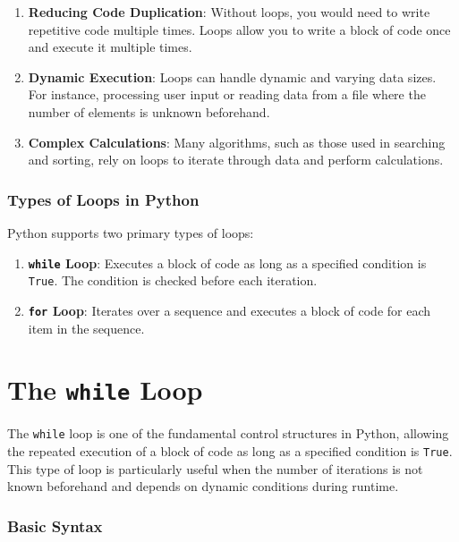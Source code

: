 \documentclass[
  letterpaper,
  DIV=11,
  numbers=noendperiod]{scrreprt}
\providecommand{\tightlist}{%
  \setlength{\itemsep}{0pt}\setlength{\parskip}{0pt}}\usepackage{longtable,booktabs,array}
\begin{document}
\begin{enumerate}
\def\labelenumi{\arabic{enumi}.}
\tightlist
\item
  \textbf{Reducing Code Duplication}: Without loops, you would need to
  write repetitive code multiple times. Loops allow you to write a block
  of code once and execute it multiple times.
\item
  \textbf{Dynamic Execution}: Loops can handle dynamic and varying data
  sizes. For instance, processing user input or reading data from a file
  where the number of elements is unknown beforehand.
\item
  \textbf{Complex Calculations}: Many algorithms, such as those used in
  searching and sorting, rely on loops to iterate through data and
  perform calculations.
\end{enumerate}

\hypertarget{types-of-loops-in-python}{%
\subsubsection{Types of Loops in
Python}\label{types-of-loops-in-python}}

Python supports two primary types of loops:

\begin{enumerate}
\def\labelenumi{\arabic{enumi}.}
\tightlist
\item
  \textbf{\texttt{while} Loop}: Executes a block of code as long as a
  specified condition is \texttt{True}. The condition is checked before
  each iteration.
\item
  \textbf{\texttt{for} Loop}: Iterates over a sequence and executes a
  block of code for each item in the sequence.
\end{enumerate}

\hypertarget{the-while-loop}{%
\section{\texorpdfstring{The \texttt{while}
Loop}{The while Loop}}\label{the-while-loop}}

The \texttt{while} loop is one of the fundamental control structures in
Python, allowing the repeated execution of a block of code as long as a
specified condition is \texttt{True}. This type of loop is particularly
useful when the number of iterations is not known beforehand and depends
on dynamic conditions during runtime.

\hypertarget{basic-syntax-3}{%
\subsubsection{Basic Syntax}\label{basic-syntax-3}}
\end{document}
